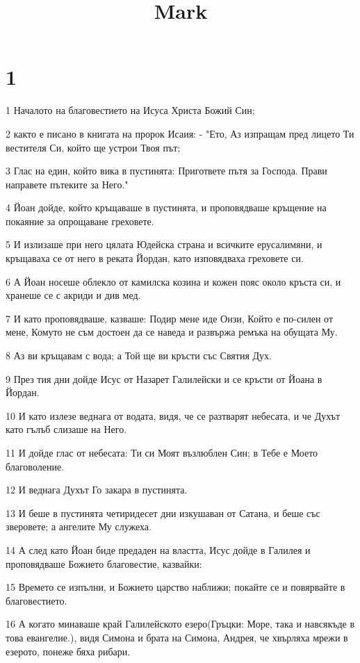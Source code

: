 

\title{Mark}


\chapter{1}

\par 1 Началото на благовестието на Исуса Христа Божий Син;
\par 2 както е писано в книгата на пророк Исаия: - "Ето, Аз изпращам пред лицето Ти вестителя Си, който ще устрои Твоя път;
\par 3 Глас на един, който вика в пустинята: Пригответе пътя за Господа. Прави направете пътеките за Него."
\par 4 Йоан дойде, който кръщаваше в пустинята, и проповядваше кръщение на покаяние за опрощаване греховете.
\par 5 И излизаше при него цялата Юдейска страна и всичките ерусалимяни, и кръщаваха се от него в реката Йордан, като изповядваха греховете си.
\par 6 А Йоан носеше облекло от камилска козина и кожен пояс около кръста си, и хранеше се с акриди и див мед.
\par 7 И като проповядваше, казваше: Подир мене иде Онзи, Който е по-силен от мене, Комуто не съм достоен да се наведа и развържа ремъка на обущата Му.
\par 8 Аз ви кръщавам с вода; а Той ще ви кръсти със Святия Дух.
\par 9 През тия дни дойде Исус от Назарет Галилейски и се кръсти от Йоана в Йордан.
\par 10 И като излезе веднага от водата, видя, че се разтварят небесата, и че Духът като гълъб слизаше на Него.
\par 11 И дойде глас от небесата: Ти си Моят възлюблен Син; в Тебе е Моето благоволение.
\par 12 И веднага Духът Го закара в пустинята.
\par 13 И беше в пустинята четиридесет дни изкушаван от Сатана, и беше със зверовете; а ангелите Му служеха.
\par 14 А след като Йоан биде предаден на властта, Исус дойде в Галилея и проповядваше Божието благовестие, казвайки:
\par 15 Времето се изпълни, и Божието царство наближи; покайте се и повярвайте в благовестието.
\par 16 А когато минаваше край Галилейското езеро(Гръцки: Море, така и навсякъде в това евангелие.), видя Симона и брата на Симона, Андрея, че хвърляха мрежи в езерото, понеже бяха рибари.
